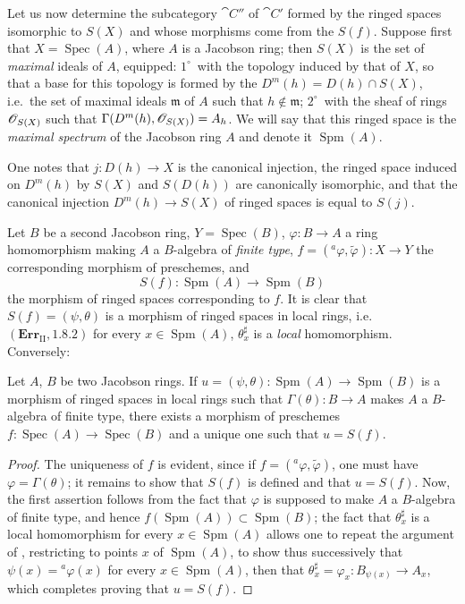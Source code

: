 \begin{env}[10.9.3]
\label{IV.10.9.3}
Let us now determine the subcategory $\cat{C}''$ of $\cat{C}'$ formed by the ringed spaces isomorphic to $S(X)$ and whose morphisms come from the $S(f)$.
Suppose first that $X=\operatorname{Spec}(A)$, where $A$ is a Jacobson ring; then $S(X)$ is the set of \emph{maximal} ideals of $A$, equipped: $1^\circ$~with the topology induced by that of $X$, so that a base for this topology is formed by the $D^m(h)=D(h)\cap S(X)$, i.e.\ the set of maximal ideals $\mathfrak{m}$ of $A$ such that $h\notin\mathfrak{m}$; $2^\circ$~with the sheaf of rings $\mathscr{O}_{S(X)}$ such that $\Gamma(D^m(h),\mathscr{O}_{S(X)})=A_h$.
We will say that this ringed space is the \emph{maximal spectrum} of the Jacobson ring $A$ and denote it $\operatorname{Spm}(A)$.

One notes that $j:D(h)\to X$ is the canonical injection, the ringed space induced on $D^m(h)$ by $S(X)$ and $S(D(h))$ are canonically isomorphic, and that the canonical injection $D^m(h)\to S(X)$ of ringed spaces is equal to $S(j)$.

Let $B$ be a second Jacobson ring, $Y=\operatorname{Spec}(B)$, $\varphi:B\to A$ a ring homomorphism making $A$ a $B$-algebra of \emph{finite type}, $f=({}^a\varphi,\widetilde{\varphi}):X\to Y$ the corresponding morphism of preschemes, and
\[
  S(f):\operatorname{Spm}(A)\to\operatorname{Spm}(B)
\]
the morphism of ringed spaces corresponding to $f$.
It is clear that $S(f)=(\psi,\theta)$ is a morphism of ringed spaces in local rings, i.e.\ $(\mathbf{Err}_{\mathrm{II}},1.8.2)$ for every $x\in\operatorname{Spm}(A)$, $\theta^\sharp_x$ is a \emph{local} homomorphism.
Conversely:
\end{env}

\begin{proposition}[10.9.4]
\label{IV.10.9.4}
Let $A$, $B$ be two Jacobson rings.
If $u=(\psi,\theta):\operatorname{Spm}(A)\to\operatorname{Spm}(B)$ is a morphism of ringed spaces in local rings such that $\Gamma(\theta):B\to A$ makes $A$ a $B$-algebra of finite type, there exists a morphism of preschemes $f:\operatorname{Spec}(A)\to\operatorname{Spec}(B)$ and a unique one such that $u=S(f)$.
\end{proposition}

\begin{proof}
The uniqueness of $f$ is evident, since if $f=({}^a\varphi,\widetilde{\varphi})$, one must have $\varphi=\Gamma(\theta)$; it remains to show that $S(f)$ is defined and that $u=S(f)$.
Now, the first assertion follows from the fact that $\varphi$ is supposed to make $A$ a $B$-algebra of finite type, and hence $f(\operatorname{Spm}(A))\subset\operatorname{Spm}(B)$; the fact that $\theta^\sharp_x$ is a local homomorphism for every $x\in\operatorname{Spm}(A)$ allows one to repeat the argument of , restricting to points $x$ of $\operatorname{Spm}(A)$, to show thus successively that $\psi(x)={}^a\varphi(x)$ for every $x\in\operatorname{Spm}(A)$, then that $\theta^\sharp_x=\varphi_x:B_{\psi(x)}\to A_x$, which completes proving that $u=S(f)$.
\end{proof}


